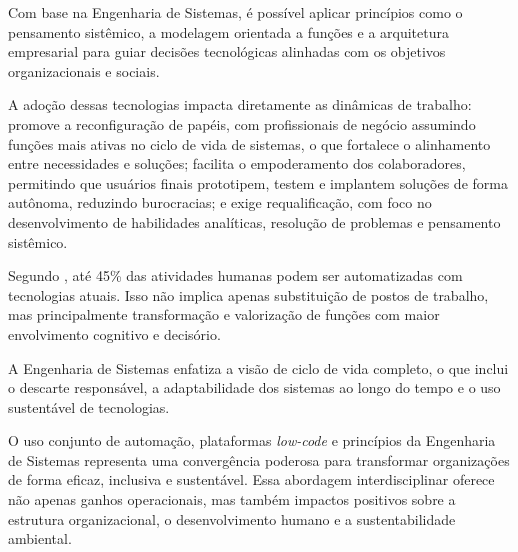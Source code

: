 Com base na Engenharia de Sistemas, é possível aplicar princípios como o pensamento sistêmico, a modelagem 
orientada a funções e a arquitetura empresarial para guiar decisões tecnológicas alinhadas com os objetivos 
organizacionais e sociais.

A adoção dessas tecnologias impacta diretamente as dinâmicas de trabalho: promove a reconfiguração de papéis, 
com profissionais de negócio assumindo funções mais ativas no ciclo de vida de sistemas, o que fortalece o 
alinhamento entre necessidades e soluções; facilita o empoderamento dos colaboradores, permitindo que usuários 
finais prototipem, testem e implantem soluções de forma autônoma, reduzindo burocracias; e exige requalificação, 
com foco no desenvolvimento de habilidades analíticas, resolução de problemas e pensamento sistêmico.

Segundo \cite{mcKinseyAutomation}, até 45\% das atividades humanas podem ser automatizadas com tecnologias atuais. Isso não implica apenas substituição de postos de trabalho, mas principalmente transformação e valorização de funções com maior envolvimento cognitivo e decisório.

A Engenharia de Sistemas enfatiza a visão de ciclo de vida completo, o que inclui o descarte responsável, a adaptabilidade dos sistemas ao longo do tempo e o uso sustentável de tecnologias.

O uso conjunto de automação, plataformas \textit{low-code} e princípios da Engenharia de Sistemas representa uma convergência poderosa para transformar organizações de forma eficaz, inclusiva e sustentável. Essa abordagem interdisciplinar oferece não apenas ganhos operacionais, mas também impactos positivos sobre a estrutura organizacional, o desenvolvimento humano e a sustentabilidade ambiental.

